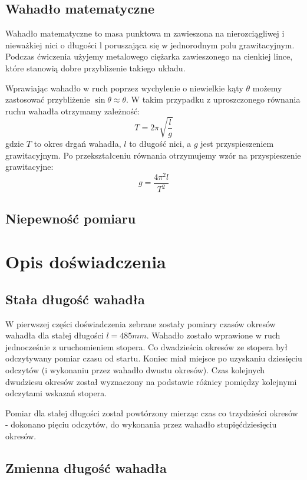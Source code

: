 \documentclass[a4paper,10pt,twoside]{article}
\begin{document}
\subsection{Wahadło matematyczne}

Wahadło matematyczne to masa punktowa m zawieszona na nierozciągliwej i nieważkiej nici o długości l poruszająca się w jednorodnym polu grawitacyjnym. Podczas ćwiczenia użyjemy metalowego ciężarka zawieszonego na cienkiej lince, które stanowią dobre przyblizenie takiego układu.

Wprawiając wahadło w ruch poprzez wychylenie o niewielkie kąty $\theta$ możemy zastosować przybliżenie $\sin\theta\approx\theta$. W takim przypadku z uproszczonego równania ruchu wahadła otrzymamy zależność: $$T = 2\pi\sqrt{\frac{l}{g}}$$gdzie $T$ to okres drgań wahadła, $l$ to długość nici, a $g$ jest przyspieszeniem grawitacyjnym. Po przekształceniu równania otrzymujemy wzór na przyspieszenie grawitacyjne: $$g = \frac{4\pi^2l}{T^2}$$

\subsection{Niepewność pomiaru}

\section{Opis doświadczenia}

\subsection{Stała długość wahadła}

W pierwszej części doświadczenia zebrane zostały pomiary czasów okresów wahadła dla stałej długości $l = 485mm$. Wahadło zostało wprawione w ruch jednocześnie z uruchomieniem stopera. Co dwadzieścia okresów ze stopera był odczytywany pomiar czasu od startu. Koniec miał miejsce po uzyskaniu dziesięciu odczytów (i wykonaniu przez wahadło dwustu okresów). Czas kolejnych dwudziesu okresów został wyznaczony na podstawie różnicy pomiędzy kolejnymi odczytami wskazań stopera.

Pomiar dla stałej długości został powtórzony mierząc czas co trzydzieści okresów - dokonano pięciu odczytów, do wykonania przez wahadło stupięćdziesięciu okresów.

\subsection{Zmienna długość wahadła}
\end{document}
